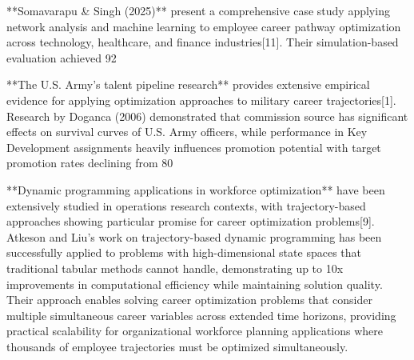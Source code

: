 \documentclass[main.tex]{subfiles}
\begin{document}
**Somavarapu \& Singh (2025)** present a comprehensive case study applying network analysis and machine learning to employee career pathway optimization across technology, healthcare, and finance industries[11]. Their simulation-based evaluation achieved 92%

**The U.S. Army's talent pipeline research** provides extensive empirical evidence for applying optimization approaches to military career trajectories[1]. Research by Doganca (2006) demonstrated that commission source has significant effects on survival curves of U.S. Army officers, while performance in Key Development assignments heavily influences promotion potential with target promotion rates declining from 80%

**Dynamic programming applications in workforce optimization** have been extensively studied in operations research contexts, with trajectory-based approaches showing particular promise for career optimization problems[9]. Atkeson and Liu's work on trajectory-based dynamic programming has been successfully applied to problems with high-dimensional state spaces that traditional tabular methods cannot handle, demonstrating up to 10x improvements in computational efficiency while maintaining solution quality. Their approach enables solving career optimization problems that consider multiple simultaneous career variables across extended time horizons, providing practical scalability for organizational workforce planning applications where thousands of employee trajectories must be optimized simultaneously.
\end{document}
